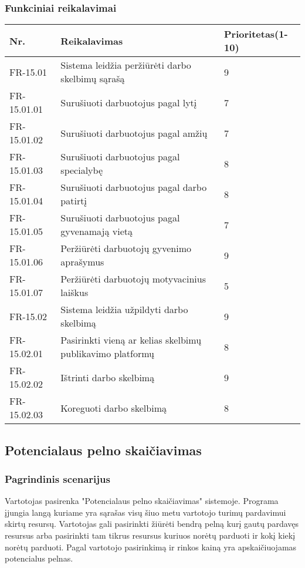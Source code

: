 \documentclass[oneside]{VUMIFPSkursinis}
\begin{document}
	\subsubsection{Funkciniai reikalavimai}
\begin{table}[htbp]
	\begin{tabularx}{1\textwidth}{ |P{2.5cm}|X|P{3cm }| }  \hline
		Nr. & Reikalavimas & Prioritetas(1-10) \\ \hline
		FR-15.01 & Sistema leidžia peržiūrėti darbo skelbimų sąrašą & 9 \\ \hline
		FR-15.01.01 & Surušiuoti darbuotojus pagal lytį & 7 \\ \hline
		FR-15.01.02 & Surušiuoti darbuotojus pagal amžių & 7 \\ \hline
		FR-15.01.03 & Surušiuoti darbuotojus pagal specialybę & 8  \\ \hline
		FR-15.01.04 & Surušiuoti darbuotojus pagal darbo patirtį & 8 \\ \hline
		FR-15.01.05 & Surušiuoti darbuotojus pagal gyvenamają vietą & 7 \\ \hline
		FR-15.01.06 & Peržiūrėti darbuotojų gyvenimo aprašymus & 9 \\ \hline
		FR-15.01.07 & Peržiūrėti darbuotojų motyvacinius laiškus & 5 \\ \hline
		FR-15.02 & Sistema leidžia užpildyti darbo skelbimą & 9 \\ \hline
		FR-15.02.01 & Pasirinkti vieną ar kelias skelbimų publikavimo platformų & 8 \\ \hline
		FR-15.02.02 & Ištrinti darbo skelbimą & 9 \\ \hline
		FR-15.02.03 & Koreguoti darbo skelbimą & 8 \\ \hline
	\end{tabularx}
\end{table}	
	
\subsection{Potencialaus pelno skaičiavimas}
	\subsubsection{Pagrindinis scenarijus}
	Vartotojas pasirenka "Potencialaus pelno skaičiavimas" sistemoje. Programa įjungia langą kuriame yra sąrašas visų šiuo metu vartotojo turimų pardavimui skirtų resursų. Vartotojas gali pasirinkti žiūrėti bendrą pelną kurį gautų pardavęs resursus arba pasirinkti tam tikrus resursus kuriuos norėtų parduoti ir kokį kiekį norėtų parduoti. Pagal vartotojo pasirinkimą ir rinkos kainą yra apskaičiuojamas potencialus pelnas.
\end{document}
